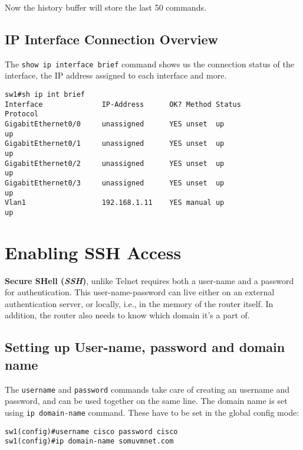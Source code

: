 \noindent
Now the history buffer will store the last 50 commands. 

\subsection{IP Interface Connection Overview}
The \verb|show ip interface brief| command shows us the connection status of the interface, the IP address assigned to each interface and more. 

\vspace{-15pt}
\begin{verbatim}
sw1#sh ip int brief
Interface              IP-Address      OK? Method Status                Protocol
GigabitEthernet0/0     unassigned      YES unset  up                    up
GigabitEthernet0/1     unassigned      YES unset  up                    up
GigabitEthernet0/2     unassigned      YES unset  up                    up
GigabitEthernet0/3     unassigned      YES unset  up                    up
Vlan1                  192.168.1.11    YES manual up                    up
\end{verbatim}
\vspace{-10pt}

\section{Enabling SSH Access}
\textbf{Secure SHell (\textit{SSH})}, unlike Telnet requires both a user-name and a password for authentication. This user-name-password can live either on an external authentication server, or locally, i.e., in the memory of the router itself. In addition, the router also needs to know which domain it's a part of. 

\subsection{Setting up User-name, password and domain name}

The \verb|username| and \verb|password| commands take care of creating an username and password, and can be used together on the same line. The domain name is set using \verb|ip domain-name| command. These have to be set in the global config mode:

\vspace{-15pt}
\begin{verbatim}
sw1(config)#username cisco password cisco
sw1(config)#ip domain-name somuvmnet.com
\end{verbatim}
\vspace{-10pt}


